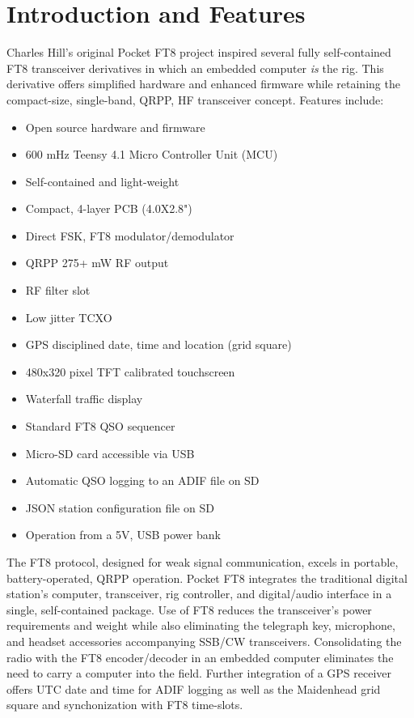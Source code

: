 \documentclass[10pt, letterpaper,]{article}
\begin{document}
\section*{Introduction and Features}
Charles Hill's original Pocket FT8 project\cite{pocketFT8} inspired several fully self-contained FT8 transceiver derivatives\cite{dxFT8}\cite{tinyDX} in which an embedded computer \textit{is} the rig.
This derivative offers simplified hardware and enhanced firmware while retaining the compact-size, single-band, QRPP, HF transceiver concept.
Features include:
  \begin{itemize} [noitemsep]
  \item Open source hardware and firmware
  \item 600 mHz Teensy 4.1 Micro Controller Unit (MCU)
  \item Self-contained and light-weight
  \item Compact, 4-layer PCB (4.0X2.8")
  \item Direct FSK, FT8 modulator/demodulator
  \item QRPP 275+ mW RF output
  \item RF filter slot
  \item Low jitter TCXO
  \item GPS disciplined date, time and location (grid square)
  \item 480x320 pixel TFT calibrated touchscreen
  \item Waterfall traffic display
  \item Standard FT8 QSO sequencer
  \item Micro-SD card accessible via USB
  \item Automatic QSO logging to an ADIF file on SD
  \item JSON station configuration file on SD
  \item Operation from a  5V, USB power bank
  \end{itemize}
The FT8 protocol\cite{qexFT8}, designed for weak signal communication, excels in portable, battery-operated, QRPP operation.
Pocket FT8 integrates the traditional digital station's computer, transceiver, rig controller, and digital/audio interface in a single, self-contained package.
Use of FT8 reduces the transceiver's power requirements and weight while also  eliminating the telegraph key, microphone, and headset accessories accompanying SSB/CW transceivers.
Consolidating the  radio with the FT8 encoder/decoder in an embedded computer eliminates the need to carry a computer into the field.
Further integration of a GPS receiver offers UTC date and time for ADIF logging as well as the Maidenhead grid square and synchonization with FT8 time-slots.
\end{document}
